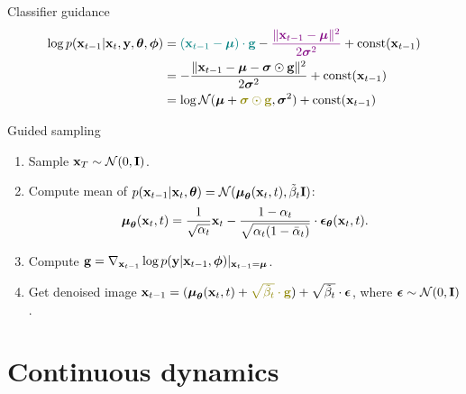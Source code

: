 \begin{frame}{Classifier guidance}
	\vspace{-0.5cm}
	\begin{align*}
		\log p(\bx_{t - 1} | \bx_t, \by, \btheta , \bphi) &= {\color{teal}(\bx_{t-1} - \bmu) \cdot \mathbf{g}} - {\color{violet}\frac{\|\bx_{t - 1} - \bmu\|^2}{2 \bsigma^2}} + \text{const}(\bx_{t-1}) \\
		& = - \frac{\|\bx_{t - 1} - \bmu - \bsigma \odot \mathbf{g}\|^2}{2 \bsigma^2} + \text{const}(\bx_{t-1}) \\
		& = \log \cN( \bmu + {\color{olive}\bsigma \odot \mathbf{g}}, \bsigma^2) + \text{const}(\bx_{t-1})
	\end{align*}
	\vspace{-0.5cm}
	\begin{block}{Guided sampling}
		\begin{enumerate}
			\item Sample $\mathbf{x}_T \sim \mathcal{N}(0, \mathbf{I})$.
			\item Compute mean of $p(\mathbf{x}_{t-1} | \mathbf{x}_t, \boldsymbol{\theta}) = \mathcal{N}(\boldsymbol{\mu}_{\boldsymbol{\theta}}(\mathbf{x}_t, t), \tilde{\beta}_t \mathbf{I})$:
			\[
				\boldsymbol{\mu}_{\boldsymbol{\theta}}(\mathbf{x}_t, t) = \frac{1}{\sqrt{\alpha_t}} \mathbf{x}_t - \frac{1 - \alpha_t}{\sqrt{\alpha_t (1 - \bar{\alpha}_t)}} \cdot \boldsymbol{\epsilon}_{\boldsymbol{\theta}}(\mathbf{x}_t, t).
			\]
			\vspace{-0.3cm}
			\item Compute $\mathbf{g} =  \nabla_{\mathbf{x}_{t-1}} \log p(\mathbf{y} | \mathbf{x}_{t-1}, \boldsymbol{\phi}) |_{\mathbf{x}_{t-1} = \boldsymbol{\mu}}$.
			\item Get denoised image $\bx_{t - 1} = (\bmu_{\btheta}(\bx_t, t) +  {\color{olive} \sqrt{\tilde{\beta}_t} \cdot \mathbf{g}})+ \sqrt{\tilde{\beta}_t} \cdot \bepsilon$, where $\boldsymbol{\epsilon} \sim \mathcal{N}(0, \mathbf{I})$.
		\end{enumerate}
	\end{block}
\end{frame}
\section{Continuous dynamics}
